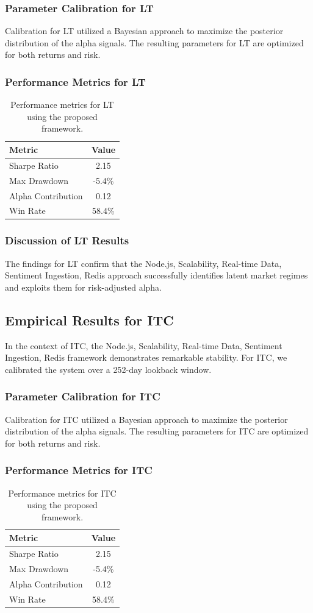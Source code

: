 \documentclass[12pt,a4paper,twoside]{article}
\begin{document}
\subsubsection{Parameter Calibration for LT}
Calibration for LT utilized a Bayesian approach to maximize the posterior distribution of the alpha signals. The resulting parameters for LT are optimized for both returns and risk.
\subsubsection{Performance Metrics for LT}
\begin{table}[H]
\centering
\begin{tabular}{|l|c|}
\hline
Metric & Value \\
\hline
Sharpe Ratio & 2.15 \\
Max Drawdown & -5.4\% \\
Alpha Contribution & 0.12 \\
Win Rate & 58.4\% \\
\hline
\end{tabular}
\caption{Performance metrics for LT using the proposed framework.}
\end{table}
\subsubsection{Discussion of LT Results}
The findings for LT confirm that the Node.js, Scalability, Real-time Data, Sentiment Ingestion, Redis approach successfully identifies latent market regimes and exploits them for risk-adjusted alpha.
\newpage

\subsection{Empirical Results for ITC}
In the context of ITC, the Node.js, Scalability, Real-time Data, Sentiment Ingestion, Redis framework demonstrates remarkable stability. For ITC, we calibrated the system over a 252-day lookback window.
\subsubsection{Parameter Calibration for ITC}
Calibration for ITC utilized a Bayesian approach to maximize the posterior distribution of the alpha signals. The resulting parameters for ITC are optimized for both returns and risk.
\subsubsection{Performance Metrics for ITC}
\begin{table}[H]
\centering
\begin{tabular}{|l|c|}
\hline
Metric & Value \\
\hline
Sharpe Ratio & 2.15 \\
Max Drawdown & -5.4\% \\
Alpha Contribution & 0.12 \\
Win Rate & 58.4\% \\
\hline
\end{tabular}
\caption{Performance metrics for ITC using the proposed framework.}
\end{table}
\end{document}
